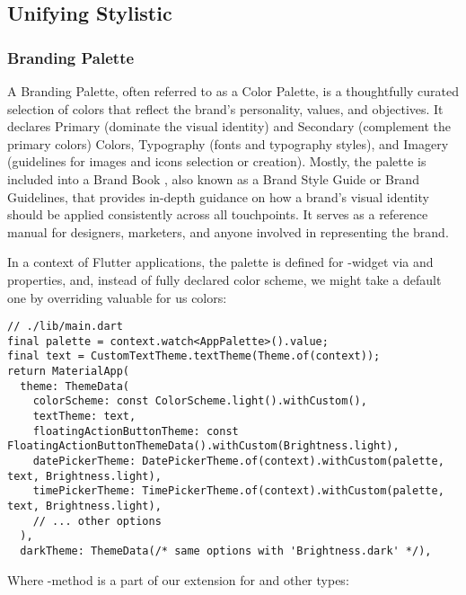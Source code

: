 
\subsection{Unifying Stylistic}


\subsubsection{Branding Palette}

A Branding Palette, often referred to as a Color Palette, is a thoughtfully curated selection of colors that reflect the 
brand's personality, values, and objectives. It declares Primary (dominate the visual identity) and Secondary 
(complement the primary colors) Colors, Typography (fonts and typography styles), and Imagery (guidelines for images 
and icons selection or creation). Mostly, the palette is included into a Brand Book \cite{Geyr16}, also known as a 
Brand Style Guide or Brand Guidelines, that provides in-depth guidance on how a brand's visual identity should be 
applied consistently across all touchpoints. It serves as a reference manual for designers, marketers, and anyone 
involved in representing the brand.

In a context of Flutter applications, the palette is defined for -widget via  and 
 properties, and, instead of fully declared color scheme, we might take a default one
by overriding valuable for us colors: 

\begin{lstlisting}
// ./lib/main.dart
final palette = context.watch<AppPalette>().value;
final text = CustomTextTheme.textTheme(Theme.of(context));
return MaterialApp(
  theme: ThemeData(
    colorScheme: const ColorScheme.light().withCustom(),
    textTheme: text,
    floatingActionButtonTheme: const FloatingActionButtonThemeData().withCustom(Brightness.light),
    datePickerTheme: DatePickerTheme.of(context).withCustom(palette, text, Brightness.light),
    timePickerTheme: TimePickerTheme.of(context).withCustom(palette, text, Brightness.light),
    // ... other options
  ),
  darkTheme: ThemeData(/* same options with 'Brightness.dark' */),
\end{lstlisting}

\noindent Where -method is a part of our extension for  and other types:

